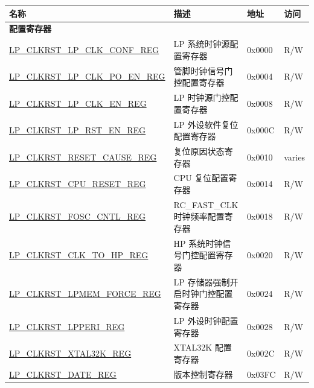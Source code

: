 \begin{longtable}{ | p{6cm} | p{7.2cm} | p{1.3cm} | p{1cm} | }
\hline\rowcolor{lightgray}
\textbf{名称} & \textbf{描述} &  \textbf{地址} & \textbf{访问} \\ \hline
\endhead
\multicolumn{4}{|l|}{\textbf{配置寄存器}} \\ \hline
\hyperref[regdesc:LPCLKRSTLPCLKCONFREG]{LP\_CLKRST\_LP\_CLK\_CONF\_REG} & LP 系统时钟源配置寄存器 & 0x0000 & R/W \\ \hline
\hyperref[regdesc:LPCLKRSTLPCLKPOENREG]{LP\_CLKRST\_LP\_CLK\_PO\_EN\_REG} & 管脚时钟信号门控配置寄存器 & 0x0004 & R/W \\ \hline
\hyperref[regdesc:LPCLKRSTLPCLKENREG]{LP\_CLKRST\_LP\_CLK\_EN\_REG} & LP 时钟源门控配置寄存器 & 0x0008 & R/W \\ \hline
\hyperref[regdesc:LPCLKRSTLPRSTENREG]{LP\_CLKRST\_LP\_RST\_EN\_REG} & LP 外设软件复位配置寄存器 & 0x000C & R/W \\ \hline
\hyperref[regdesc:LPCLKRSTRESETCAUSEREG]{LP\_CLKRST\_RESET\_CAUSE\_REG} & 复位原因状态寄存器 & 0x0010 & varies \\ \hline
\hyperref[regdesc:LPCLKRSTCPURESETREG]{LP\_CLKRST\_CPU\_RESET\_REG} & CPU 复位配置寄存器 & 0x0014 & R/W \\ \hline
\hyperref[regdesc:LPCLKRSTFOSCCNTLREG]{LP\_CLKRST\_FOSC\_CNTL\_REG} & RC\_FAST\_CLK 时钟频率配置寄存器 & 0x0018 & R/W \\ \hline
\hyperref[regdesc:LPCLKRSTCLKTOHPREG]{LP\_CLKRST\_CLK\_TO\_HP\_REG} & HP 系统时钟信号门控配置寄存器 & 0x0020 & R/W \\ \hline
\hyperref[regdesc:LPCLKRSTLPMEMFORCEREG]{LP\_CLKRST\_LPMEM\_FORCE\_REG} & LP 存储器强制开启时钟门控配置寄存器 & 0x0024 & R/W \\ \hline
\hyperref[regdesc:LPCLKRSTLPPERIREG]{LP\_CLKRST\_LPPERI\_REG} & LP 外设时钟配置寄存器 & 0x0028 & R/W \\ \hline
\hyperref[regdesc:LPCLKRSTXTAL32KREG]{LP\_CLKRST\_XTAL32K\_REG} &  XTAL32K 配置寄存器 & 0x002C & R/W \\ \hline
\hyperref[regdesc:LPCLKRSTDATEREG]{LP\_CLKRST\_DATE\_REG} & 版本控制寄存器 & 0x03FC & R/W \\ \hline
\end{longtable}
